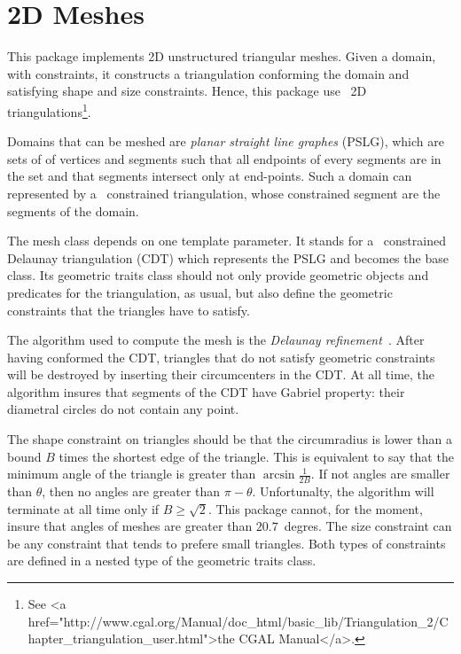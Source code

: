 \chapter{2D Meshes}

This package implements 2D unstructured triangular meshes. Given a
domain, with constraints, it constructs a triangulation conforming the
domain and satisfying shape and size constraints. Hence, this package 
use \cgal\ 2D triangulations\footnote{See 
{<a href="http://www.cgal.org/Manual/doc_html/basic_lib/Triangulation_2/Chapter_triangulation_user.html">the CGAL Manual</a>.}}.

Domains that can be meshed are \emph{planar straight line graphes}
(PSLG), which are sets of of vertices and segments such that all
endpoints of every segments are in the set and that segments intersect
only at end-points. Such a domain can represented by a \cgal\ 
constrained triangulation, whose constrained segment are the segments
of the domain.

The mesh class depends on one template parameter. It stands for a
\cgal\ constrained Delaunay triangulation (CDT) which represents the
PSLG and becomes the base class. Its geometric traits class should not
only provide geometric objects and predicates for the triangulation,
as usual, but also define the geometric constraints that the triangles
have to satisfy.

The algorithm used to compute the mesh is the \emph{Delaunay
  refinement}~\cite{s-mgdsa-00}. After having conformed the CDT,
triangles that do not satisfy geometric constraints will be destroyed
by inserting their circumcenters in the CDT. At all time, the algorithm
insures that segments of the CDT have Gabriel property: their diametral
circles do not contain any point.

The shape constraint on triangles should be that the circumradius is
lower than a bound $B$ times the shortest edge of the triangle. This is
equivalent to say that the minimum angle of the triangle is greater
than $\arcsin{\frac{1}{2B}}$. If not angles are smaller than $\theta$,
then no angles are greater than $\pi - \theta$. Unfortunalty, the
algorithm will terminate at all time only if $B \ge \sqrt{2}$. This
package cannot, for the moment, insure that angles of meshes are
greater than $20.7$~degres. The size constraint can be any constraint
that tends to prefere small triangles. Both types of constraints are
defined in a nested type \ccc{Is_bad} of the geometric traits class.

